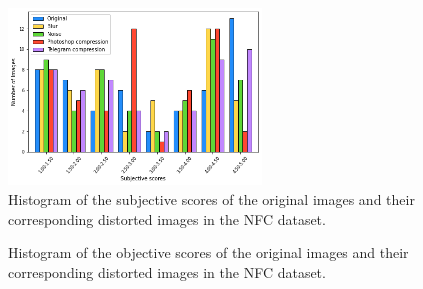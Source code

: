 \begin{figure}[h]
    \centering
    \includegraphics[width=0.6\textwidth]{figures/NFC_HistogramSUB.png}
    \caption{Histogram of the subjective scores of the original images and their corresponding distorted images in the NFC dataset.}
    \label{fig:NFC2HistogramSUB}
\end{figure}

\begin{figure}[h]
\centering
    \caption{Histogram of the objective scores of the original images and their corresponding distorted images in the NFC dataset.}
    \label{fig:NFC2Histogram}
\end{figure}

